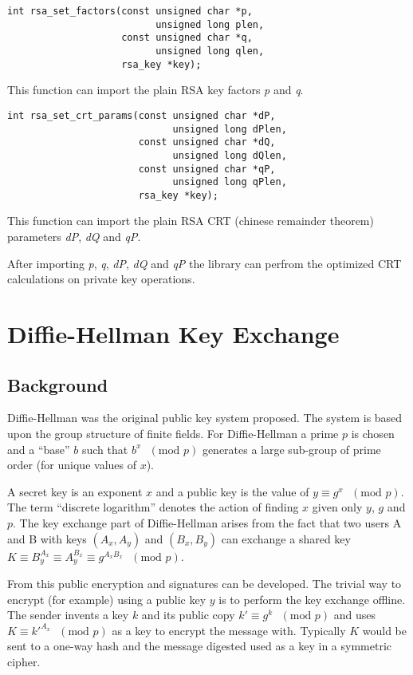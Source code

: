 \documentclass[synpaper]{book}
\newcommand{\mysection}[1]    %
	{                   %
	\section{#1}
   \markboth{\textsf{www.libtom.net}}{\thesection ~ {#1}}
	}
\begin{document}
\begin{verbatim}
int rsa_set_factors(const unsigned char *p,
                          unsigned long plen,
                    const unsigned char *q,
                          unsigned long qlen,
                    rsa_key *key);
\end{verbatim}

This function can import the plain RSA key factors \textit{p} and \textit{q}.

\begin{verbatim}
int rsa_set_crt_params(const unsigned char *dP,
                             unsigned long dPlen,
                       const unsigned char *dQ,
                             unsigned long dQlen,
                       const unsigned char *qP,
                             unsigned long qPlen,
                       rsa_key *key);
\end{verbatim}

This function can import the plain RSA CRT (chinese remainder theorem) parameters \textit{dP}, \textit{dQ} and \textit{qP}.

After importing \textit{p}, \textit{q}, \textit{dP}, \textit{dQ} and \textit{qP}
the library can perfrom the optimized CRT calculations on private key operations.

\chapter{Diffie-Hellman Key Exchange}

\mysection{Background}

Diffie-Hellman was the original public key system proposed.  The system is based upon the group structure
of finite fields.  For Diffie-Hellman a prime $p$ is chosen and a ``base'' $b$ such that $b^x\mbox{ }(\mbox{mod }p)$
generates a large sub-group of prime order (for unique values of $x$).

A secret key is an exponent $x$ and a public key is the value of $y \equiv g^x\mbox{ }(\mbox{mod }p)$.  The term
``discrete logarithm'' denotes the action of finding $x$ given only $y$, $g$ and $p$.  The key exchange part of
Diffie-Hellman arises from the fact that two users A and B with keys $(A_x, A_y)$ and $(B_x, B_y)$ can exchange
a shared key $K \equiv B_y^{A_x} \equiv A_y^{B_x} \equiv g^{A_xB_x}\mbox{ }(\mbox{mod }p)$.

From this public encryption and signatures can be developed.  The trivial way to encrypt (for example) using a public key
$y$ is to perform the key exchange offline.  The sender invents a key $k$ and its public copy
$k' \equiv g^k\mbox{ }(\mbox{mod }p)$ and uses $K \equiv k'^{A_x}\mbox{ }(\mbox{mod }p)$ as a key to encrypt
the message with.  Typically $K$ would be sent to a one-way hash and the message digested used as a key in a
symmetric cipher.
\end{document}
